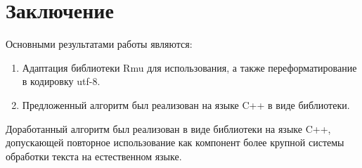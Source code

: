 \chapter{Заключение} \label{chapt6}

Основными результатами работы являются:
\begin{enumerate}
  \item Адаптация библиотеки Rmu для использования, а также переформатирование в кодировку utf-8.
  \item Предложенный алгоритм был реализован на языке C++ в виде библиотеки.
\end{enumerate}

Доработанный алгоритм был реализован в виде библиотеки на языке C++, допускающей повторное использование как компонент более крупной системы обработки текста на естественном языке.

\clearpage
